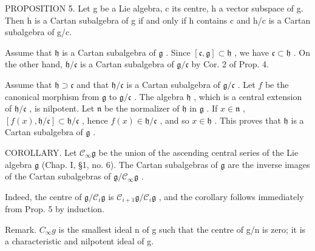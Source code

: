 PROPOSITION 5. Let g be a Lie algebra, c its centre, h a vector subspace of g. Then h is a Cartan subalgebra of g if and only if h contains c and h/c is a Cartan subalgebra of g/c.

Assume that \(\mathfrak{h}\) is a Cartan subalgebra of \(\mathfrak{g}\) . Since \([\mathfrak{c},\mathfrak{g}]\subset \mathfrak{h}\) , we have \(\mathfrak{c}\subset \mathfrak{h}\) . On the other hand, \(\mathfrak{h} / \mathfrak{c}\) is a Cartan subalgebra of \(\mathfrak{g} / \mathfrak{c}\) by Cor. 2 of Prop. 4.

Assume that \(\mathfrak{h} \supset \mathfrak{c}\) and that \(\mathfrak{h} / \mathfrak{c}\) is a Cartan subalgebra of \(\mathfrak{g} / \mathfrak{c}\) . Let \(f\) be the canonical morphism from \(\mathfrak{g}\) to \(\mathfrak{g} / \mathfrak{c}\) . The algebra \(\mathfrak{h}\) , which is a central extension of \(\mathfrak{h} / \mathfrak{c}\) , is nilpotent. Let \(\mathfrak{n}\) be the normalizer of \(\mathfrak{h}\) in \(\mathfrak{g}\) . If \(x \in \mathfrak{n}\) , \([f(x), \mathfrak{h} / \mathfrak{c}] \subset \mathfrak{h} / \mathfrak{c}\) , hence \(f(x) \in \mathfrak{h} / \mathfrak{c}\) , and so \(x \in \mathfrak{h}\) . This proves that \(\mathfrak{h}\) is a Cartan subalgebra of \(\mathfrak{g}\) .

COROLLARY. Let \(\mathcal{C}_{\infty}\mathfrak{g}\) be the union of the ascending central series of the Lie algebra \(\mathfrak{g}\) (Chap. I, §1, no. 6). The Cartan subalgebras of \(\mathfrak{g}\) are the inverse images of the Cartan subalgebras of \(\mathfrak{g}/\mathcal{C}_{\infty}\mathfrak{g}\) .

Indeed, the centre of \(\mathfrak{g} / \mathcal{C}_i\mathfrak{g}\) is \(\mathcal{C}_{i + 1}\mathfrak{g} / \mathcal{C}_i\mathfrak{g}\) , and the corollary follows immediately from Prop. 5 by induction.

Remark. \(C_{\infty}g\) is the smallest ideal n of g such that the centre of g/n is zero; it is a characteristic and nilpotent ideal of g.


